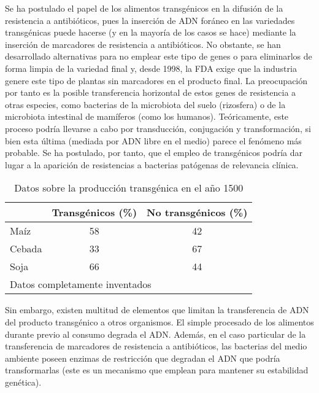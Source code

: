 \documentclass[11pt,twoside]{article}
\begin{document}
Se ha postulado el papel de los alimentos transgénicos en la difusión de la resistencia a antibióticos, pues la inserción de ADN foráneo en las variedades transgénicas puede hacerse (y en la mayoría de los casos se hace) mediante la inserción de marcadores de resistencia a antibióticos.
No obstante, se han desarrollado alternativas para no emplear este tipo de genes o para eliminarlos de forma limpia de la variedad final y, desde 1998, la FDA exige que la industria genere este tipo de plantas sin marcadores en el producto final.
La preocupación por tanto es la posible transferencia horizontal de estos genes de resistencia a otras especies, como bacterias de la microbiota del suelo (rizosfera) o de la microbiota intestinal de mamíferos (como los humanos). Teóricamente, este proceso podría llevarse a cabo por transducción, conjugación y transformación, si bien esta última (mediada por ADN libre en el medio) parece el fenómeno más probable. Se ha postulado, por tanto, que el empleo de transgénicos podría dar lugar a la aparición de resistencias a bacterias patógenas de relevancia clínica.




%

\begin{table}[h!]
\begin{center}
\begin{tabular}{|l|c|c|}
\hline
     &  Transgénicos (\%)  & No transgénicos (\%)  \\
\hline\hline
Maíz  &    58  &   42 \\
\hline
Cebada &   33   &  67   \\
\hline
Soja   &  66   & 44 \\
\hline
\multicolumn{3}{l}{\footnotesize Datos completamente inventados}
\end{tabular}
\end{center}
\caption{Datos sobre la producción transgénica en el año 1500}\label{tabla.transg}
\end{table}



Sin embargo, existen multitud de elementos que limitan la transferencia de ADN del producto transgénico a otros organismos. El simple procesado de los alimentos durante previo al consumo degrada el ADN.
Además, en el caso particular de la transferencia de marcadores de resistencia a antibióticos, las bacterias del medio ambiente poseen enzimas de restricción que degradan el ADN que podría transformarlas (este es un mecanismo que emplean para mantener su estabilidad genética).
\end{document}
